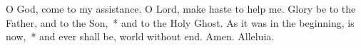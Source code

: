\documentclass[12pt]{book}
\begin{document}
 
 \twosided[pc] %
 
  \thispagestyle{empty}
 
 {\par}
 \vspace{0.5\baselineskip}
 
 {\par}
 


\noindent
\begin{enpars}
O God, \cc{} come to my assistance. \rr O Lord, make haste to help me. Glory be to the Father, and to the Son,~* and to the Holy Ghost. As it was in the beginning, is now,~* and ever shall be, world without end. Amen. Alleluia.\end{enpars}

\end{document}
